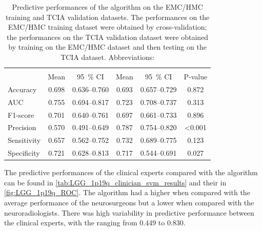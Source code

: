 \begin{table}[htbp]
    \begin{tabular}{L{2cm} S[table-format=1.3] S[table-format=2.7] S[table-format=1.3]  S[table-format=2.7] S[table-format=1.3, table-comparator = true]}
        \toprule
        &  &  \\
        \cmidrule(lr){2-3} \cmidrule(lr){4-5}
        & {Mean} & {\SI{95}{\percent} CI} & {Mean} & {\SI{95}{\percent} CI} & {P-value}\\
        \midrule
        Accuracy & 0.698 & \numrange{0.636}{0.760} & 0.693 & \numrange{0.657}{0.729} & 0.872\\
        \acrshort{AUC} & 0.755 & \numrange{0.694}{0.817} & 0.723 &\numrange{0.708}{0.737} & 0.313\\
        F1-score & 0.701 & \numrange{0.640}{0.761} & 0.697 & \numrange{0.661}{0.733} & 0.896\\
        Precision & 0.570 & \numrange{0.491}{0.649} & 0.787 & \numrange{0.754}{0.820} & <0.001\\
        Sensitivity & 0.657 & \numrange{0.562}{0.752} & 0.732 & \numrange{0.689}{0.775} & 0.123\\
        Specificity & 0.721 & \numrange{0.628}{0.813} & 0.717 & \numrange{0.544}{0.691} & 0.027\\
        \bottomrule
    \end{tabular}
    \caption{Predictive performances of the algorithm on the \acrshort{EMC}/\acrshort{HMC} training and \acrshort{TCIA} validation datasets. The performances on the \acrshort{EMC}/\acrshort{HMC} training dataset were obtained by cross-validation; the performances on the \acrshort{TCIA} validation dataset were obtained by training on the \acrshort{EMC}/\acrshort{HMC} dataset and then testing on the \acrshort{TCIA} dataset. Abbreviations: }\label{tab:LGG_1p19q_svm_results}
    \end{table}



The predictive performances of the clinical experts compared with the algorithm can be found in \cref{tab:LGG_1p19q_clinician_svm_results} and their  in \cref{fig:LGG_1p19q_ROC}.
The algorithm had a higher  when compared with the average performance of the neurosurgeons but a lower  when compared with the neuroradiologists.
There was high variability in predictive performance between the clinical experts, with the  ranging from \num{0.449} to \num{0.830}.

